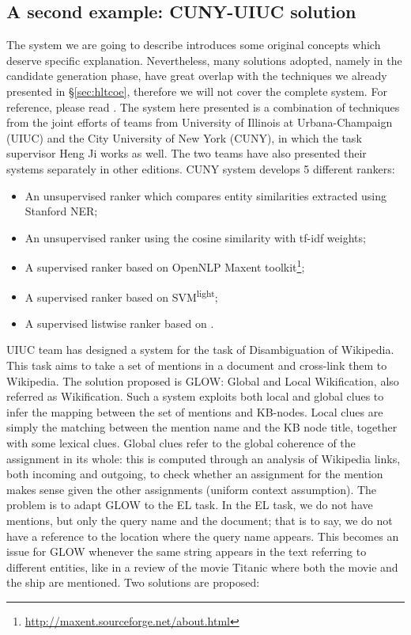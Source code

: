 \documentclass[a4paper,11pt]{report}
\begin{document}
\subsection{A second example: CUNY-UIUC solution}
\label{sec:uiuc}
The system we are going to describe introduces some original concepts which deserve specific explanation. Nevertheless, many solutions adopted, namely in the candidate generation phase, have great overlap with the techniques we already presented in \S \ref{sec:hltcoe}, therefore we will not cover the complete system. For reference, please read \cite{2011cuny, chen2010cuny, 2012cuny}.
The system here presented is a combination of techniques from the joint efforts of teams from University of Illinois at Urbana-Champaign (UIUC) and the City University of New York (CUNY), in which the task supervisor Heng Ji works as well. The two teams have also presented their systems separately in other editions.
CUNY system develops 5 different rankers:
\begin{itemize}
\item An unsupervised ranker which compares entity similarities extracted using Stanford NER;
\item An unsupervised ranker using the cosine similarity with tf-idf weights;
\item A supervised ranker based on OpenNLP Maxent toolkit\footnote{\url{http://maxent.sourceforge.net/about.html}}; 
\item A supervised ranker based on SVM\textsuperscript{light};
\item A supervised listwise ranker based on \citet{cao2007}.
\end{itemize}
UIUC team has designed a system for the task of Disambiguation of Wikipedia. This task aims to take a set of mentions in a document and cross-link them to Wikipedia. The solution proposed is GLOW: Global and Local Wikification, also referred as Wikification. Such a system exploits both local and global clues to infer the mapping between the set of mentions and KB-nodes. Local clues are simply the matching between the mention name and the KB node title, together with some lexical clues. Global clues refer to the global coherence of the assignment in its whole: this is computed through an analysis of Wikipedia links, both incoming and outgoing, to check whether an assignment for the mention makes sense given the other assignments (uniform context assumption).
The problem is to adapt GLOW to the EL task. In the EL task, we do not have mentions, but only the query name and the document; that is to say, we do not have a reference to the location where the query name appears. This becomes an issue for GLOW whenever the same string appears in the text referring to different entities, like in a review of the movie Titanic where both the movie and the ship are mentioned. Two solutions are proposed:
\end{document}
